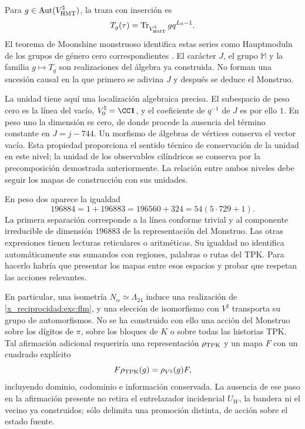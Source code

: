 Para $g\in\operatorname{Aut}(V^\natural_{\rm HMT})$, la traza
con inserción es
\[
 T_g(\tau)=
 \operatorname{Tr}_{V^\natural_{\rm HMT}}gq^{L_0-1}.
\]
El teorema de Moonshine monstruoso identifica estas series como
Hauptmoduln de los grupos de género cero correspondientes
\cite[teorema~1.1]{x_reciprocidad:borcherds}.
El carácter $J$, el grupo $\mathbb M$ y la familia $g\mapsto T_g$
son realizaciones del álgebra ya construida. No forman una sucesión
causal en la que primero se adivina $J$ y después se deduce el Monstruo.

La unidad tiene aquí una localización algebraica precisa. El subespacio
de peso cero es la línea del vacío, \(V^\natural_0=\CC\mathbf1\), y
el coeficiente de \(q^{-1}\) de \(J\) es por ello \(1\). En peso uno
la dimensión es cero, de donde procede la ausencia del término constante
en \(J=j-744\). Un morfismo de álgebras de vértices conserva el vector
vacío. Esta propiedad proporciona el sentido técnico de conservación
de la unidad en este nivel; la unidad de los observables cilíndricos
se conserva por la precomposición demostrada anteriormente. La relación
entre ambos niveles debe seguir los mapas de construcción con sus unidades.

En peso dos aparece la igualdad
\[
 196884=1+196883=196560+324=54(5\cdot729+1).
\]
La primera separación corresponde a la línea conforme trivial y al
componente irreducible de dimensión $196883$ de la representación
del Monstruo. Las otras expresiones tienen lecturas reticulares o
aritméticas. Su igualdad no identifica automáticamente sus sumandos
con regiones, palabras o rutas del TPK. Para hacerlo habría que
presentar los mapas entre esos espacios y probar que respetan las
acciones relevantes.

En particular, una isometría $N_\alpha\simeq\Lambda_{24}$ induce
una realización de \eqref{x_reciprocidad:exc:flm}, y una elección de isomorfismo
con $V^\natural$ transporta su grupo de automorfismos. No se ha
construido con ello una acción del Monstruo sobre los dígitos de
$\pi$, sobre los bloques de $K$ o sobre todas las historias TPK.
Tal afirmación adicional requeriría una representación
$\rho_{\rm TPK}$ y un mapa $F$ con un cuadrado explícito
\[
 F\rho_{\rm TPK}(g)=\rho_{V^\natural}(g)F,
\]
incluyendo dominio, codominio e información conservada. La ausencia
de ese paso en la afirmación presente no retira el entrelazador
incidencial $U_W$, la bandera ni el vecino ya construidos; sólo
delimita una promoción distinta, de acción sobre el estado fuente.

